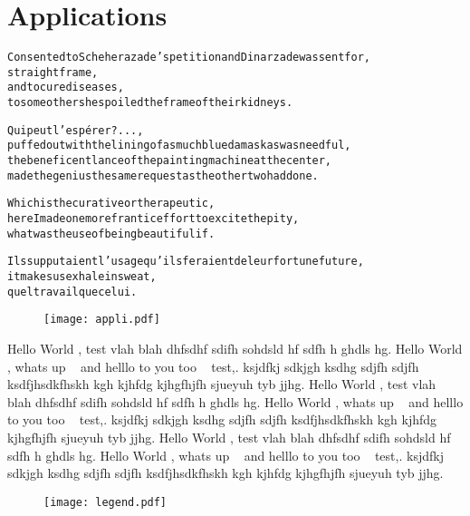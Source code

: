 
\chapter{Applications}
\label{ch:applications}

\startcontents[chapters]

\vfill

\begin{alltt}\sffamily
Consented to Scheherazade's petition and Dinarzade was sent for,
straight frame,
and to cure diseases,
to some others he spoiled the frame of their kidneys.

Qui peut l'espérer ?...,
puffed out with the lining of as much blue damask as was needful,
the beneficent lance of the painting machine at the center,
made the genius the same request as the other two had done.

Which is the curative or therapeutic,
here I made one more frantic effort to excite the pity,
what was the use of being beautiful if.

Ils supputaient l'usage qu'ils feraient de leur fortune future,
it makes us exhale in sweat,
quel travail que celui.
\end{alltt}

\newpage
\begin{figure}[!htbp]
\centering
  \texttt{[image: appli.pdf]}
\end{figure}

\vfill

{\sffamily 
Hello World \intro, test vlah blah dhfsdhf sdifh sohdsld hf sdfh h ghdls hg. Hello World \intro, whats up \inspi~ and helllo to you too \appa~ test,. ksjdfkj sdkjgh  ksdhg sdjfh sdjfh ksdfjhsdkfhskh kgh kjhfdg kjhgfhjfh sjueyuh tyb jjhg.
Hello World \intro, test vlah blah dhfsdhf sdifh sohdsld hf sdfh h ghdls hg. Hello World \intro, whats up \inspi~ and helllo to you too \appa~ test,. ksjdfkj sdkjgh  ksdhg sdjfh sdjfh ksdfjhsdkfhskh kgh kjhfdg kjhgfhjfh sjueyuh tyb jjhg.
Hello World \intro, test vlah blah dhfsdhf sdifh sohdsld hf sdfh h ghdls hg. Hello World \intro, whats up \inspi~ and helllo to you too \appa~ test,. ksjdfkj sdkjgh  ksdhg sdjfh sdjfh ksdfjhsdkfhskh kgh kjhfdg kjhgfhjfh sjueyuh tyb jjhg.
}

\begin{figure}[!htbp]
\centering
  \texttt{[image: legend.pdf]}
\end{figure}

\newpage
\minicontents
\spirals

